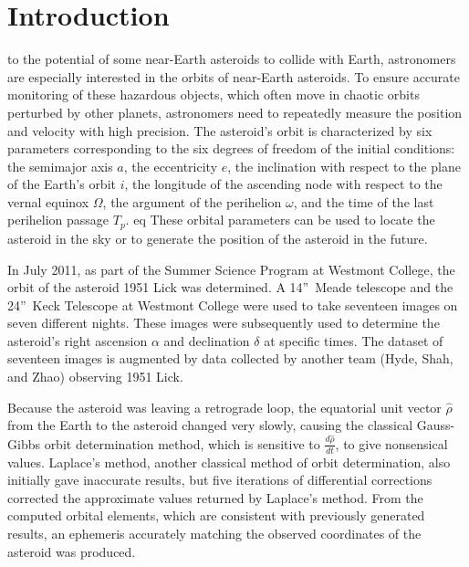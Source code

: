\documentclass[12pt,journal,compsoc]{IEEEtran}
\begin{document}
\IEEEdisplaynotcompsoctitleabstractindextext
\IEEEpeerreviewmaketitle

\section{Introduction}
to the potential of some near-Earth asteroids to collide with Earth, 
astronomers are especially interested in the orbits of near-Earth asteroids.
To ensure accurate monitoring of these hazardous objects, 
which often move in chaotic orbits perturbed by other planets, 
astronomers need to repeatedly measure the position and velocity with high precision.  
The asteroid's orbit is characterized by six parameters
corresponding to the six degrees of freedom of the initial conditions: 
the semimajor axis $a$, 
the eccentricity $e$, 
the inclination with respect to the plane of the Earth's orbit $i$, 
the longitude of the ascending node with respect to the vernal equinox $\Omega$, 
the argument of the perihelion $\omega$, 
and the time of the last perihelion passage $T_p$.  eq
These orbital parameters can be used to locate the asteroid in the sky or to generate the position of the asteroid in the future.

In July 2011, as part of the Summer Science Program at Westmont College, the orbit of the asteroid 1951 Lick was determined. 
A 14''~Meade telescope and the 24''~Keck Telescope at Westmont College were used to take seventeen images on seven different nights. 
These images were subsequently used to determine the asteroid's right ascension $\alpha$ and declination $\delta$ at specific times.
The dataset of seventeen images is augmented by data collected by another team (Hyde, Shah, and Zhao) observing 1951 Lick.

Because the asteroid was leaving a retrograde loop, 
the equatorial unit vector $\hat{\rho}$ from the Earth to the asteroid changed very slowly, 
causing the classical Gauss-Gibbs orbit determination method, which is sensitive to $\frac{d\hat{\rho}}{dt}$, 
to give nonsensical values.
Laplace's method, 
another classical method of orbit determination, 
also initially gave inaccurate results, 
but five iterations of differential corrections 
corrected the approximate values returned by Laplace's method. 
From the computed orbital elements, which are consistent with previously generated results, 
an ephemeris accurately matching the observed coordinates of the asteroid was produced.
\end{document}
